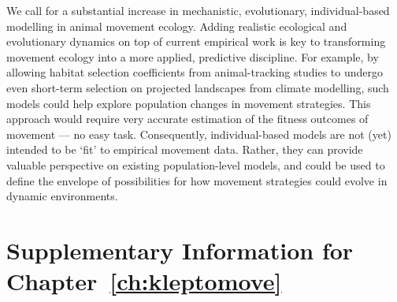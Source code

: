 {We call for a substantial increase in mechanistic, evolutionary, individual-based modelling in animal movement ecology.
Adding realistic ecological and evolutionary dynamics on top of current empirical work is key to transforming movement ecology into a more applied, predictive discipline.
For example, by allowing habitat selection coefficients from animal-tracking studies to undergo even short-term selection on projected landscapes from climate modelling, such models could help explore population changes in movement strategies.
This approach would require very accurate estimation of the fitness outcomes of movement --- no easy task.
Consequently, individual-based models are not (yet) intended to be `fit' to empirical movement data.
Rather, they can provide valuable perspective on existing population-level models, and could be used to define the envelope of possibilities for how movement strategies could evolve in dynamic environments.



{ \begin{center}  \end{center} }


\newpage

\begingroup

\let\clearpage\relax
\let\cleardoublepage\relax
\let\cleardoublepage\relax

{\chapter*{Supplementary Information for Chapter~\ref{ch:kleptomove}}}

}
